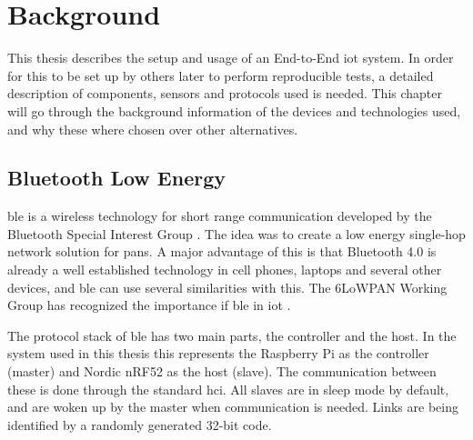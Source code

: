 \chapter{Background}
\label{chp:background} 

This thesis describes the setup and usage of an End-to-End \gls{iot} system. In order for this to be set up by others later to perform reproducible tests, a detailed description of components, sensors and protocols used is needed. This chapter will go through the background information of the devices and technologies used, and why these where chosen over other alternatives. 






\section{Bluetooth Low Energy}

\gls{ble} is a wireless technology for short range communication developed by the Bluetooth Special Interest Group \cite{gomez2012overview}. The idea was to create a low energy single-hop network solution for \glspl{pan}. A major advantage of this is that Bluetooth 4.0 is already a well established technology in cell phones, laptops and several other devices, and \gls{ble} can use several similarities with this. The 6LoWPAN Working Group has recognized the importance if \gls{ble} in \gls{iot} \cite{hui2008extending}.

The protocol stack of \gls{ble} has two main parts, the controller and the host. In the system used in this thesis this represents the Raspberry Pi as the controller (master) and Nordic nRF52 as the host (slave). The communication between these is done through the standard \gls{hci}. All slaves are in sleep mode by default, and are woken up by the master when communication is needed. Links are being identified by a randomly generated 32-bit code. 

